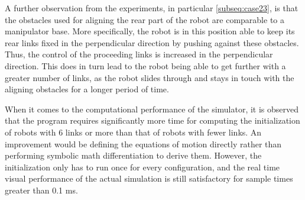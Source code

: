 A further observation from the experiments, in particular \ref{subseq:case23}, is that the obstacles used for aligning the rear part of the robot are comparable to a manipulator base. More specifically, the robot is in this position able to keep its rear links fixed in the perpendicular direction by pushing against these obstacles. Thus, the control of the proceeding links is increased in the perpendicular direction.
This does in turn lead to the robot being able to get further with a greater number of links, as the robot slides through and stays in touch with the aligning obstacles for a longer period of time.

When it comes to the computational performance of the simulator, it is observed that the program requires significantly more time for computing the initialization of robots with 6 links or more than that of robots with fewer links. An improvement would be defining the equations of motion directly rather than performing symbolic math differentiation to derive them. However, the initialization only has to run once for every configuration, and the real time visual performance of the actual simulation is still satisfactory for sample times greater than 0.1 ms.



